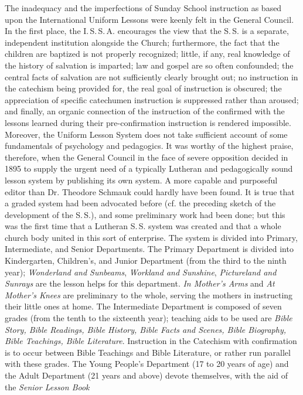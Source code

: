 The inadequacy and the imperfections of Sunday School instruction as based upon the International Uniform Lessons were keenly felt in the General Council. In the first place, the I.\,S.\,S.\,A. encourages the view that the S.\,S. is a separate, independent institution alongside the Church; furthermore, the fact that the children are baptized is not properly recognized; little, if any, real knowledge of the history of salvation is imparted; law and gospel are so often confounded; the central facts of salvation are not sufficiently clearly brought out; no instruction in the catechism being provided for, the real goal of instruction is obscured; the appreciation
of specific catechumen instruction is suppressed rather than aroused; and finally, an organic connection of the instruction of the confirmed with the lessons learned during their pre-confirmation instruction is rendered impossible. Moreover, the Uniform Lesson System does not take sufficient account of some fundamentals of psychology and pedagogics. It was worthy of the highest praise, therefore, when the General Council in the face of severe opposition decided in 1895 to supply the urgent need of a typically Lutheran and pedagogically sound lesson system by publishing its own system. A more capable and purposeful editor than Dr. Theodore Schmauk could hardly have been found. It is true that a graded system had been advocated before (cf. the preceding sketch of the development of the S.\,S.), and some preliminary work had been done; but this was the first time that a Lutheran S.\,S. system was created and that a whole church body united in this sort of enterprise. The system is divided into Primary, Intermediate, and Senior Departments. The Primary Department is divided into Kindergarten, Children’s, and Junior Department (from the third to the ninth year); \emph{Wonderland and Sunbeams}, \emph{Workland and Sunshine}, \emph{Pictureland and Sunrays} are the lesson helps for this department. \emph{In Mother’s Arms} and \emph{At Mother’s Knees} are preliminary to the whole, serving the mothers in instructing their little ones at home. The Intermediate Department is composed of seven grades (from the tenth to the sixteenth year); teaching aids to be used are \emph{Bible Story, Bible Readings, Bible History, Bible Facts and Scenes, Bible Biography, Bible Teachings, Bible Literature}. Instruction in the Catechism with confirmation is to occur between Bible Teachings and Bible Literature, or rather run parallel with these grades. The Young People’s Department (17 to 20 years of age) and the Adult Department (21 years and above) devote themselves, with the aid of the \emph{Senior Lesson Book}
